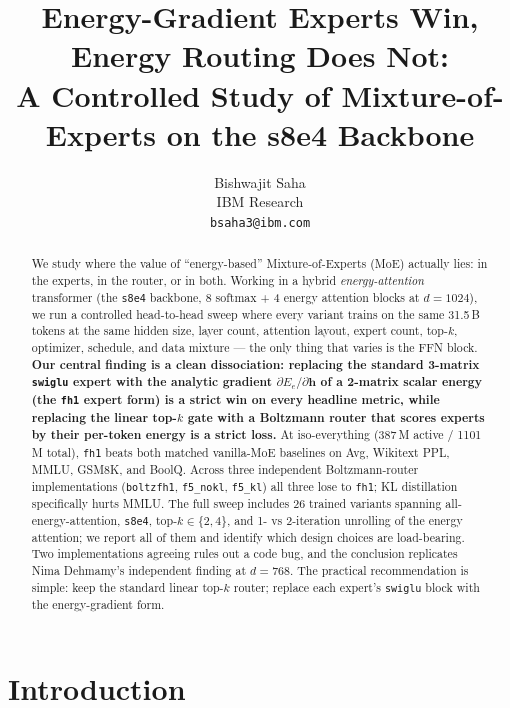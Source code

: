 \documentclass[oneside]{article}
\title{Energy-Gradient Experts Win, Energy Routing Does Not:\\
A Controlled Study of Mixture-of-Experts on the s8e4 Backbone}
\author{
  Bishwajit Saha \\
  IBM Research \\
  \texttt{bsaha3@ibm.com}
}
\begin{document}
\maketitle

\begin{abstract}
We study where the value of ``energy-based'' Mixture-of-Experts (MoE)
actually lies: in the experts, in the router, or in both. Working in a
hybrid \emph{energy-attention} transformer (the \texttt{s8e4} backbone, 8
softmax + 4 energy attention blocks at $d{=}1024$), we run a controlled
head-to-head sweep where every variant trains on the same 31.5\,B tokens at
the same hidden size, layer count, attention layout, expert count,
top-$k$, optimizer, schedule, and data mixture --- the only thing that
varies is the FFN block.
\textbf{Our central finding is a clean dissociation: replacing the standard
3-matrix \texttt{swiglu} expert with the analytic gradient
$\partial E_e/\partial \mathbf{h}$ of a 2-matrix scalar energy (the
\texttt{fh1} expert form) is a strict win on every headline metric,
while replacing the linear top-$k$ gate with a Boltzmann router that
scores experts by their per-token energy is a strict loss.}
At iso-everything (387\,M active / 1101\,M total), \texttt{fh1} beats both
matched vanilla-MoE baselines on Avg, Wikitext PPL, MMLU, GSM8K, and
BoolQ. Across three independent Boltzmann-router implementations
(\texttt{boltzfh1}, \texttt{f5\_nokl}, \texttt{f5\_kl}) all three lose to
\texttt{fh1}; KL distillation specifically hurts MMLU. The full sweep
includes 26 trained variants spanning all-energy-attention,
\texttt{s8e4}, top-$k\in\{2,4\}$, and 1- vs 2-iteration unrolling of the
energy attention; we report all of them and identify which design choices
are load-bearing. Two implementations agreeing rules out a code bug, and
the conclusion replicates Nima Dehmamy's independent finding at
$d{=}768$. The practical recommendation is simple: keep the standard
linear top-$k$ router; replace each expert's \texttt{swiglu} block with
the energy-gradient form.
\end{abstract}


\section{Introduction}
\end{document}
